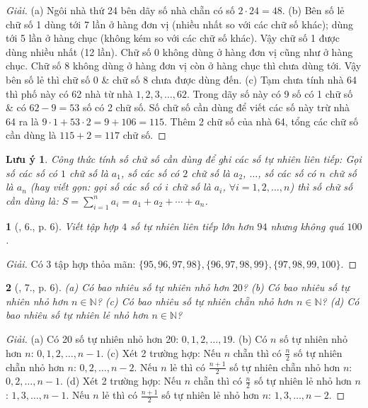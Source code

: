 \documentclass{article}
\newtheorem{baitoan}{}
\newtheorem{luuy}{Lưu ý}
\begin{document}
\begin{proof}[Giải]
	(a) Ngôi nhà thứ 24 bên dãy số nhà chẵn có số $2\cdot24 = 48$. (b) Bên số lẻ chữ số 1 dùng tới 7 lần ở hàng đơn vị (nhiều nhất so với các chữ số khác); dùng tới 5 lần ở hàng chục (không kém so với các chữ số khác). Vậy chữ số 1 được dùng nhiều nhất (12 lần). Chữ số 0 không dùng ở hàng đơn vị cũng như ở hàng chục. Chữ số 8 không dùng ở hàng đơn vị còn ở hàng chục thì chưa dùng tới. Vậy bên số lẻ thì chữ số 0 \& chữ số 8 chưa được dùng đến. (c) Tạm chưa tính nhà 64 thì phố này có 62 nhà từ nhà $1,2,3,\ldots,62$. Trong dãy số này có 9 số có 1 chữ số \& có $62 - 9 = 53$ số có 2 chữ số. Số chữ số cần dùng để viết các số này trừ nhà 64 ra là $9\cdot1 + 53\cdot2 = 9 + 106 = 115$. Thêm 2 chữ số của nhà 64, tổng các chữ số cần dùng là $115 + 2 = 117$ chữ số.
\end{proof}

\begin{luuy}
	Công thức tính số chữ số cần dùng để ghi các số tự nhiên liên tiếp: Gọi số các số có $1$ chữ số là $a_1$, số các số có $2$ chữ số là $a_2$, $\ldots$,  số các số có $n$ chữ số là $a_n$ (hay viết gọn: gọi số các số có $i$ chữ số là $a_i$, $\forall i = 1,2,\ldots,n$) thì số chữ số cần dùng là: $S = \sum_{i=1}^n a_i = a_1 + a_2 + \cdots + a_n$.
\end{luuy}

\begin{baitoan}[\cite{Tuyen_Toan_6}, 6., p. 6]
	Viết tập hợp $4$ số tự nhiên liên tiếp lớn hơn $94$ nhưng không quá $100$.
\end{baitoan}

\begin{proof}[Giải]
	Có 3 tập hợp thỏa mãn: $\{95,96,97,98\},\{96,97,98,99\},\{97,98,99,100\}$.
\end{proof}

\begin{baitoan}[\cite{Tuyen_Toan_6}, 7., p. 6]
	(a) Có bao nhiêu số tự nhiên nhỏ hơn $20$? (b) Có bao nhiêu số tự nhiên nhỏ hơn $n\in\mathbb{N}$? (c) Có bao nhiêu số tự nhiên chẵn nhỏ hơn $n\in\mathbb{N}$? (d) Có bao nhiêu số tự nhiên lẻ nhỏ hơn $n\in\mathbb{N}$?
\end{baitoan}

\begin{proof}[Giải]
	(a) Có 20 số tự nhiên nhỏ hơn 20: $0,1,2,\ldots,19$. (b) Có $n$ số tự nhiên nhỏ hơn $n$: $0,1,2,\ldots,n - 1$. (c) Xét 2 trường hợp: Nếu $n$ chẵn thì có $\frac{n}{2}$ số tự nhiên chẵn nhỏ hơn $n$: $0,2,\ldots,n - 2$. Nếu $n$ lẻ thì có $\frac{n + 1}{2}$ số tự nhiên chẵn nhỏ hơn $n$: $0,2,\ldots,n - 1$. (d) Xét 2 trường hợp: Nếu $n$ chẵn thì có $\frac{n}{2}$ số tự nhiên lẻ nhỏ hơn $n$: $1,3,\ldots,n - 1$. Nếu $n$ lẻ thì có $\frac{n + 1}{2}$ số tự nhiên lẻ nhỏ hơn $n$: $1,3,\ldots,n - 2$.
\end{proof}
\end{document}

